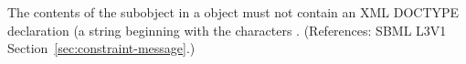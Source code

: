 The contents of the \Message subobject in a \Constraint object must not
contain an XML DOCTYPE declaration (\ie a string beginning with the
characters .  (References: SBML L3V1
Section~\ref{sec:constraint-message}.)
